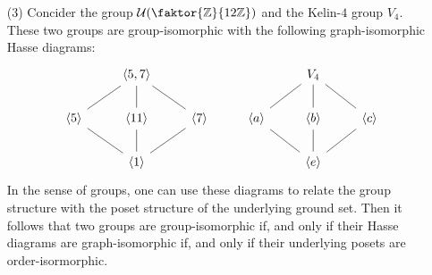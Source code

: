 \begin{example}
\begin{enumerate}
    \item[(3)] Concider the group $\Uc(\faktor{\Z}{12\Z})$ and the
      Kelin-$4$ group $V_4$. These two groups are group-isomorphic with the
      following graph-isomorphic Hasse diagrams:
      \[\begin{tikzcd}
  & {\langle 5,7 \rangle} &&& {V_4} \\
        {\langle 5 \rangle} & {\langle 11 \rangle} & {\langle 7 \rangle} & {\langle a \rangle} & {\langle b \rangle} & {\langle c \rangle} \\
                            & {\langle 1 \rangle} &&& {\langle e \rangle}
                            \arrow[no head, from=1-2, to=2-2]
                            \arrow[no head, from=1-2, to=2-3]
                            \arrow[no head, from=1-5, to=2-4]
                            \arrow[no head, from=2-1, to=1-2]
                            \arrow[no head, from=2-2, to=3-2]
                            \arrow[no head, from=2-3, to=3-2]
                            \arrow[no head, from=2-4, to=3-5]
                            \arrow[no head, from=2-5, to=1-5]
                            \arrow[no head, from=2-6, to=1-5]
                            \arrow[no head, from=3-2, to=2-1]
                            \arrow[no head, from=3-5, to=2-5]
                            \arrow[no head, from=3-5, to=2-6]
      \end{tikzcd}\]
      In the sense of groups, one can use these diagrams to relate the
      group structure with the poset structure of the underlying
      ground set. Then it follows that two groups are group-isomorphic
      if, and only if their Hasse diagrams are graph-isomorphic if,
      and only if their underlying posets are order-isormorphic.


\end{enumerate}
\end{example}
